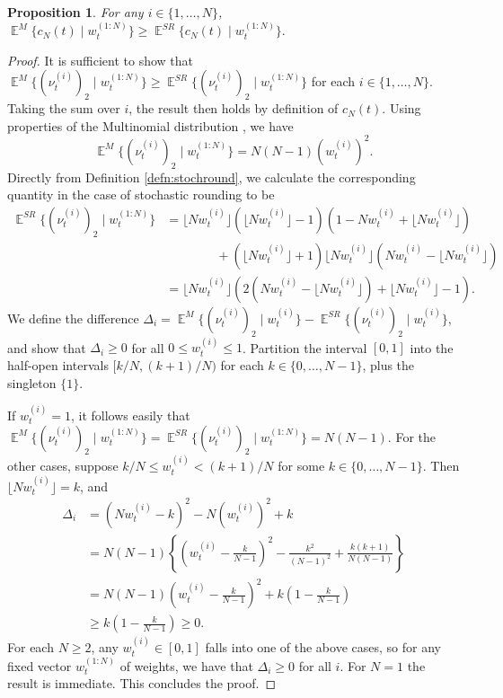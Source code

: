 \documentclass{article}
\newtheorem{proposition}{Proposition}
\theoremstyle{definition}
\DeclareMathOperator{\E}{\mathbb{E}}
\newcommand{\flnw}{\lfloor N w_t^{(i)} \rfloor}
\newcommand{\1}[1]{\mathbbm{1}_{\{#1\}}}
\begin{document}
\begin{proposition}
For any $i \in \{1, \dots, N\}$,
$
\E^{M}\{c_N(t) \mid w_t^{(1:N)}\} \geq \E^{SR}\{c_N(t) \mid w_t^{(1:N)}\}.
$
\end{proposition}
\begin{proof}
It is sufficient to show that $\E^{M}\{(\nu_t^{(i)})_2 \mid w_t^{(1:N)}\} \geq \E^{SR}\{(\nu_t^{(i)})_2 \mid w_t^{(1:N)}\}$ for each $i \in \{1, \dots, N\}$. Taking the sum over $i$, the result then holds by definition of $c_N(t)$.
Using properties of the Multinomial distribution \citep{mosimann1962}, we have
\begin{equation*}
\E^{M}\{(\nu_t^{(i)})_2 \mid w_t^{(1:N)}\}  = N(N-1) (w_t^{(i)})^2 .
\end{equation*}
Directly from Definition \ref{defn:stochround}, we calculate the corresponding quantity in the case of stochastic rounding to be
\begin{align*}
\E^{SR}\{(\nu_t^{(i)})_2 \mid w_t^{(1:N)}\} 
&= \flnw (\flnw -1) (1 - Nw_t^{(i)} + \flnw) \\
&\qquad\qquad + (\flnw +1) \flnw (Nw_t^{(i)} - \flnw) \\
&= \flnw \left( 2(Nw_t^{(i)} - \flnw) + \flnw -1 \right) .
\end{align*}
We define the difference $\Delta_i = \E^{M}\{ (\nu_t^{(i)})_2 \mid w_t^{(i)} \} - \E^{SR}\{ (\nu_t^{(i)})_2 \mid w_t^{(i)} \} $,
and show that $\Delta_i \geq 0$ for all $0 \leq w_t^{(i)} \leq 1$. Partition the interval $[0,1]$ into the half-open intervals $[k/N, (k+1)/N)$ for each $k\in \{0, \dots, N-1\}$, plus the singleton $\{1\}$.

If $w_t^{(i)}=1$, it follows easily that $\E^{M}\{ (\nu_t^{(i)})_2 \mid w_t^{(1:N)} \} = \E^{SR}\{ (\nu_t^{(i)})_2 \mid w_t^{(1:N)} \} = N(N-1) $. 
For the other cases, suppose $k/N \leq w_t^{(i)} < (k+1)/N $ for some $k \in \{0, \dots, N-1\}$. Then $\flnw = k$, and
\begin{align*}
\Delta_i &= (Nw_t^{(i)} - k)^2 - N (w_t^{(i)})^2 + k\\
&= N(N-1) \left\{ \left( w_t^{(i)} -\frac{k}{N-1} \right)^2 - \frac{k^2}{(N-1)^2} + \frac{k(k+1)}{N(N-1)} \right\}\\
&= N(N-1) \left( w_t^{(i)} -\frac{k}{N-1} \right)^2 + k\left(1-\frac{k}{N-1}\right) \\
&\geq k\left(1-\frac{k}{N-1}\right)
\geq 0 .
\end{align*}
For each $N\geq 2$, any $w_t^{(i)} \in [0,1]$ falls into one of the above cases, so for any fixed vector $w_t^{(1:N)}$ of weights, we have that $\Delta_i \geq 0$ for all $i$. For $N=1$ the result is immediate. This concludes the proof.
\end{proof}
\end{document}
